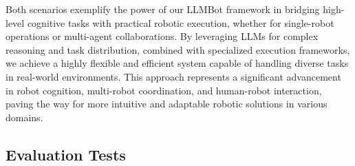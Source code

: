 \documentclass[pdflatex,sn-mathphys-num]{sn-jnl}
\theoremstyle{thmstyleone}
\theoremstyle{thmstyletwo}%
\theoremstyle{thmstylethree}%
\begin{document}
Both scenarios exemplify the power of our LLMBot framework in bridging high-level cognitive tasks with practical robotic execution, whether for single-robot operations or multi-agent collaborations. By leveraging LLMs for complex reasoning and task distribution, combined with specialized execution frameworks, we achieve a highly flexible and efficient system capable of handling diverse tasks in real-world environments. This approach represents a significant advancement in robot cognition, multi-robot coordination, and human-robot interaction, paving the way for more intuitive and adaptable robotic solutions in various domains.

\newpage
\subsection{Evaluation Tests}
\end{document}
